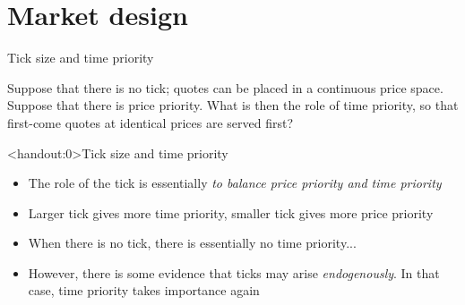 \documentclass[english,10pt
,aspectratio=169
]{beamer}
\begin{document}
\section{Market design}

\begin{frame}{Tick size and time priority}
	\begin{exampleblock}{}
		Suppose that there is no tick; quotes can  be placed in a continuous price space. Suppose that there is price priority. What is then the role of time priority, so that first-come quotes at identical prices are served first?
	\end{exampleblock}
	
\end{frame}


\begin{frame}<handout:0>{Tick size and time priority}
	\begin{itemize}
		\item The role of the tick is essentially \textit{to balance price priority and time priority}
		\item Larger tick gives more time priority, smaller tick gives more price priority
		\item When there is no tick, there is essentially no time priority...
		\item However, there is some evidence that ticks may arise \textit{endogenously}. In that case, time priority takes importance again
	\end{itemize}
\end{frame}
\end{document}
